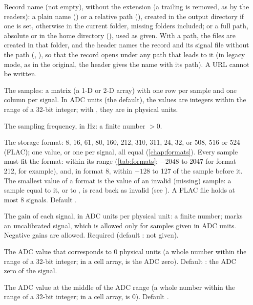 \begin{params}
\item[record] Record name (not empty), without the  extension (a trailing
   is removed, as by the readers): a plain name
  () or a relative path (), created in the output directory
  if one is set, otherwise in the current folder, missing folders included; or a full
  path, absolute or in the home directory (), used
  as given. With a path, the files are created in that folder, and the header names the
  record and its signal file without the path (, ), so that
  the record opens under any path that leads to it (in legacy mode, as in the original,
  the header gives the name with its path). A URL cannot be written.
\item[signals] The samples: a matrix (a 1-D or 2-D array) with one row per sample and one
  column per signal.
  In ADC units (the default), the values are integers within the range of a 32-bit
  integer; with , they are in physical units.
\item[fs] The sampling frequency, in Hz: a finite number $> 0$.
\item[fmt] The storage format: 8, 16, 61, 80, 160, 212, 310, 311, 24, 32, or 508, 516 or
  524 (FLAC); one value, or one per signal, all equal (\cref{chap:formats}). Every sample
  must fit the format: within its range (\cref{tab:formats}; $-2048$ to 2047 for format
  212, for example), and, in format 8, within $-128$ to 127 of the sample before it. The
  smallest value of a format is the value of an invalid (missing) sample: a sample equal
  to it, or to , is read back as invalid (see
  ). A FLAC file holds at most 8 signals. Default .
\item[gains] The gain of each signal, in ADC units per physical unit: a finite number;
   marks an uncalibrated signal, which is allowed only for samples given in ADC
  units. Negative gains are allowed. Required (default \code{[]}: not given).
\item[baselines] The ADC value that corresponds to 0 physical units (a whole number within
  the range of a 32-bit integer; in a cell array, \code{[]} is the ADC zero). Default
  \code{[]}: the ADC zero of the signal.
\item[adczeros] The ADC value at the middle of the ADC range (a whole number within the
  range of a 32-bit integer; in a cell array, \code{[]} is 0). Default .

\end{params}
